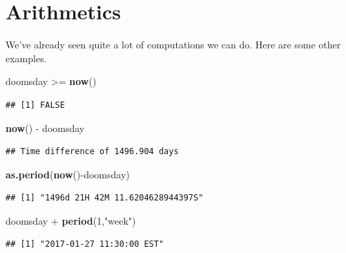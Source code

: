 \documentclass[]{tufte-book}
\newenvironment{Shaded}{}{}
\newcommand{\DecValTok}[1]{\textcolor[rgb]{0.25,0.63,0.44}{#1}}
\newcommand{\KeywordTok}[1]{\textcolor[rgb]{0.00,0.44,0.13}{\textbf{#1}}}
\newcommand{\NormalTok}[1]{#1}
\newcommand{\OperatorTok}[1]{\textcolor[rgb]{0.40,0.40,0.40}{#1}}
\newcommand{\StringTok}[1]{\textcolor[rgb]{0.25,0.44,0.63}{#1}}
\begin{document}
\hypertarget{arithmetics}{%
\section{Arithmetics}\label{arithmetics}}

We've already seen quite a lot of computations we can do. Here are some other examples.

\begin{Shaded}
\begin{Highlighting}[]
\NormalTok{doomsday }\OperatorTok{>=}\StringTok{ }\KeywordTok{now}\NormalTok{()}
\end{Highlighting}
\end{Shaded}

\begin{verbatim}
## [1] FALSE
\end{verbatim}

\begin{Shaded}
\begin{Highlighting}[]
\KeywordTok{now}\NormalTok{() }\OperatorTok{-}\StringTok{ }\NormalTok{doomsday}
\end{Highlighting}
\end{Shaded}

\begin{verbatim}
## Time difference of 1496.904 days
\end{verbatim}

\begin{Shaded}
\begin{Highlighting}[]
\KeywordTok{as.period}\NormalTok{(}\KeywordTok{now}\NormalTok{()}\OperatorTok{-}\NormalTok{doomsday)}
\end{Highlighting}
\end{Shaded}

\begin{verbatim}
## [1] "1496d 21H 42M 11.6204628944397S"
\end{verbatim}

\begin{Shaded}
\begin{Highlighting}[]
\NormalTok{doomsday }\OperatorTok{+}\StringTok{ }\KeywordTok{period}\NormalTok{(}\DecValTok{1}\NormalTok{,}\StringTok{"week"}\NormalTok{)}
\end{Highlighting}
\end{Shaded}

\begin{verbatim}
## [1] "2017-01-27 11:30:00 EST"
\end{verbatim}
\end{document}
